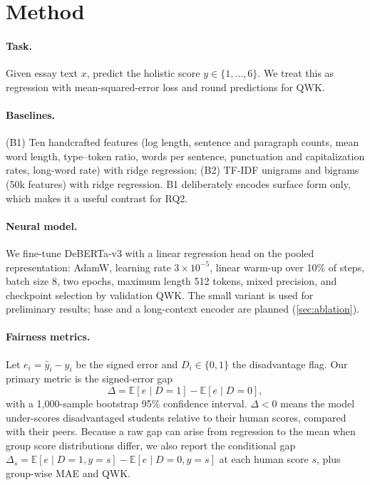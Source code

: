 \documentclass{article}
\begin{document}
\section{Method}
\label{sec:method}

\paragraph{Task.} Given essay text $x$, predict the holistic score $y \in \{1,\dots,6\}$. We treat this as regression with mean-squared-error loss and round predictions for QWK.

\paragraph{Baselines.} (B1) Ten handcrafted features (log length, sentence and paragraph counts, mean word length, type--token ratio, words per sentence, punctuation and capitalization rates, long-word rate) with ridge regression; (B2) TF-IDF unigrams and bigrams (50k features) with ridge regression. B1 deliberately encodes surface form only, which makes it a useful contrast for RQ2.

\paragraph{Neural model.} We fine-tune DeBERTa-v3 \citep{he2023debertav3} with a linear regression head on the pooled representation: AdamW, learning rate $3\times10^{-5}$, linear warm-up over 10\% of steps, batch size 8, two epochs, maximum length 512 tokens, mixed precision, and checkpoint selection by validation QWK. The small variant is used for preliminary results; base and a long-context encoder are planned (\cref{sec:ablation}).

\paragraph{Fairness metrics.} Let $e_i = \hat{y}_i - y_i$ be the signed error and $D_i \in \{0,1\}$ the disadvantage flag. Our primary metric is the signed-error gap
\begin{equation}
  \Delta = \mathbb{E}[e \mid D=1] - \mathbb{E}[e \mid D=0],
  \label{eq:gap}
\end{equation}
with a 1{,}000-sample bootstrap 95\% confidence interval. $\Delta<0$ means the model under-scores disadvantaged students relative to their human scores, compared with their peers. Because a raw gap can arise from regression to the mean when group score distributions differ, we also report the conditional gap $\Delta_s = \mathbb{E}[e \mid D=1, y=s] - \mathbb{E}[e \mid D=0, y=s]$ at each human score $s$, plus group-wise MAE and QWK.
\end{document}

